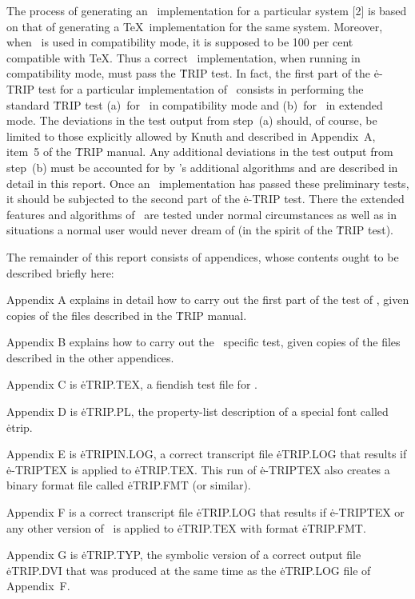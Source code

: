 The process of generating an \eTeX\ implementation for a particular
system [2] is based on that of generating a \TeX\ implementation for the
same system.  Moreover, when \eTeX\ is used in compatibility mode, it is
supposed to be 100 per cent compatible with \TeX.  Thus a correct \eTeX\
implementation, when running in compatibility mode, must pass the
\.{TRIP} test.  In fact, the first part of the \.{e-TRIP} test for a
particular implementation of \eTeX\ consists in performing the standard
\.{TRIP} test (a)~for \eTeX\ in compatibility mode and (b)~for \eTeX\ in
extended mode.  The deviations in the test output from step~(a) should,
of course, be limited to those explicitly allowed by Knuth and described
in Appendix~A, item~5 of the \.{TRIP} manual.  Any additional deviations
in the test output from step~(b) must be accounted for by \eTeX's
additional algorithms and are described in detail in this report.  Once
an \eTeX\ implementation has passed these preliminary tests, it should be
subjected to the second part of the \.{e-TRIP} test.  There the extended
features and algorithms of \eTeX\ are tested under normal circumstances
as well as in situations a normal user would never dream of (in the
spirit of the \.{TRIP} test).

The remainder of this report consists of appendices, whose contents ought
to be described briefly here:

Appendix A explains in detail how to carry out the first part of the
test of \eTeX, given copies of the files described in the \.{TRIP}
manual.

Appendix B explains how to carry out the \eTeX\ specific test, given
copies of the files described in the other appendices.

Appendix C is \.{eTRIP.TEX}, a fiendish test file for \eTeX.

Appendix D is \.{eTRIP.PL}, the property-list description of a
special font called \.{etrip}.

Appendix E is \.{eTRIPIN.LOG}, a correct transcript file \.{eTRIP.LOG}
that results if \.{e-TRIPTEX} is applied to \.{eTRIP.TEX}.
This run of \.{e-TRIPTEX} also creates a binary format file called
\.{eTRIP.FMT} (or similar).

Appendix F is a correct transcript file \.{eTRIP.LOG} that results if
\.{e-TRIPTEX} or any other version of \eTeX\ is applied to \.{eTRIP.TEX}
with format \.{eTRIP.FMT}.

Appendix G is \.{eTRIP.TYP}, the symbolic version of a correct output
file \.{eTRIP.DVI} that was produced at the same time as the
\.{eTRIP.LOG} file of Appendix~F.

